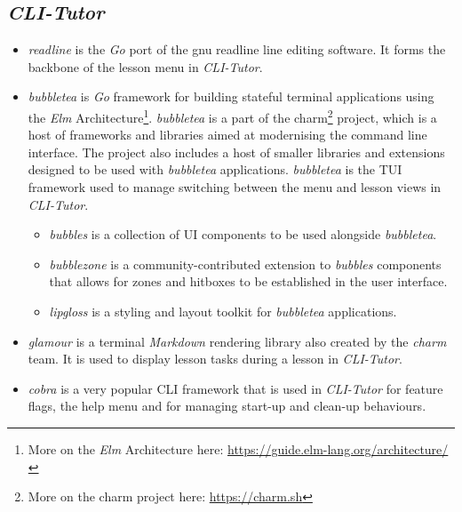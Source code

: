 \subsection{\textit{CLI-Tutor}}
\begin{itemize}
    \item \textit{readline} is the \textit{Go} port of the gnu readline
        \cite{ramey_fox_readline} line editing software. It forms the backbone
        of the lesson menu in \textit{CLI-Tutor}.

    \item \textit{bubbletea} is \textit{Go} framework for building stateful terminal
        applications using the \textit{Elm} Architecture\footnote{More on the \textit{Elm}
        Architecture here: \url{https://guide.elm-lang.org/architecture/}}.
        \textit{bubbletea} is a part of the charm\footnote{More on the charm
        project here: \url{https://charm.sh}} project, which is a host of
        frameworks and libraries aimed at modernising the command line
        interface. The project also includes a host of smaller libraries and
        extensions designed to be used with \textit{bubbletea}
        applications. \textit{bubbletea} is the TUI framework used to manage
        switching between the menu and lesson views in \textit{CLI-Tutor}.

        \begin{itemize}
            \item \textit{bubbles} is a collection of UI components to be used alongside \textit{bubbletea}.
            \item \textit{bubblezone} is a community-contributed extension to
                \textit{bubbles} components that allows for zones and hitboxes
                to be established in the user interface.
            \item \textit{lipgloss} is a styling and layout toolkit for \textit{bubbletea} applications.
        \end{itemize}

    \item \textit{glamour} is a terminal \textit{Markdown} rendering library also 
        created by the \textit{charm} team. It is used to display lesson tasks
        during a lesson in \textit{CLI-Tutor}.

    \item \textit{cobra} is a very popular CLI framework that is used in
        \textit{CLI-Tutor} for feature flags, the help menu and for managing
        start-up and clean-up behaviours.
        

\end{itemize}
